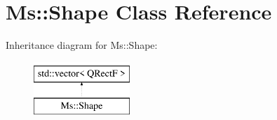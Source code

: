 \hypertarget{class_ms_1_1_shape}{}\section{Ms\+:\+:Shape Class Reference}
\label{class_ms_1_1_shape}
Inheritance diagram for Ms\+:\+:Shape\+:\begin{figure}[H]
\begin{center}
\leavevmode
\includegraphics[height=2.000000cm]{class_ms_1_1_shape}
\end{center}
\end{figure}
